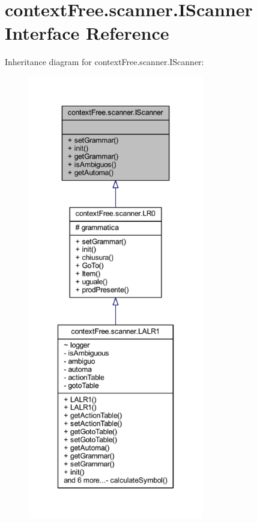 \hypertarget{interfacecontext_free_1_1scanner_1_1_i_scanner}{\section{context\-Free.\-scanner.\-I\-Scanner Interface Reference}
\label{interfacecontext_free_1_1scanner_1_1_i_scanner}
}


Inheritance diagram for context\-Free.\-scanner.\-I\-Scanner\-:\nopagebreak
\begin{figure}[H]
\begin{center}
\leavevmode
\includegraphics[height=550pt]{interfacecontext_free_1_1scanner_1_1_i_scanner__inherit__graph}
\end{center}
\end{figure}
